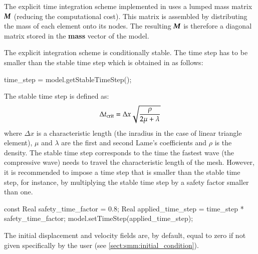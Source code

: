 The explicit time integration scheme implemented in \akantu uses a
lumped mass matrix $\boldsymbol{M}$ (reducing the computational cost). This
matrix is assembled by distributing the mass of each element onto its
nodes. The resulting $\boldsymbol{M}$ is therefore a diagonal matrix stored
in the \textbf{mass} vector of the model.

The explicit integration scheme is conditionally stable. The time step
has to be smaller than the stable time step which is obtained in
\akantu as follows:

\begin{cpp}
time_step = model.getStableTimeStep();
\end{cpp} 

The stable time step is defined as:
\begin{equation}
\label{eqn:smm:explicit:stabletime}
\Delta t_{{\mathrm{crit}}} = \Delta x \sqrt{\frac{\rho}{2 \mu + \lambda}}
\end{equation}
where $\Delta x$ is a characteristic length (\eg the inradius in the
case of linear triangle element), $\mu$ and $\lambda$ are the first
and second Lame's coefficients and $\rho$ is the density.  The stable
time step corresponds to the time the fastest wave (the compressive
wave) needs to travel the characteristic length of the mesh.
However, it is recommended to impose a time step that is smaller than the stable time step, for
instance, by multiplying the stable time step by a safety factor
smaller than one.

\begin{cpp}
const Real safety_time_factor = 0.8;
Real applied_time_step = time_step * safety_time_factor;
model.setTimeStep(applied_time_step);
\end{cpp}
 The initial displacement and
velocity fields are, by default, equal to zero if not given
specifically by the user (see \ref{sect:smm:initial_condition}).

